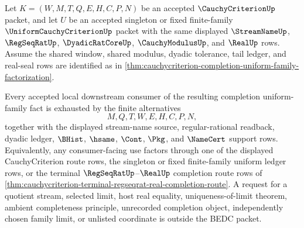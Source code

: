 \begin{lemma}
\label{lem:cauchycriterion-completion-uniform-family-downstream-coverage}
Let $K=(W,M,T,Q,E,H,C,P,N)$ be an accepted $\CauchyCriterionUp$ packet, and let $U$ be an accepted singleton or fixed finite-family $\UniformCauchyCriterionUp$ packet with the same displayed $\StreamNameUp$, $\RegSeqRatUp$, $\DyadicRatCoreUp$, $\CauchyModulusUp$, and $\RealUp$ rows. Assume the shared window, shared modulus, dyadic tolerance, tail ledger, and real-seal rows are identified as in \autoref{thm:cauchycriterion-completion-uniform-family-factorization}.

Every accepted local downstream consumer of the resulting completion uniform-family fact is exhausted by the finite alternatives
$$
M,Q,T,W,E,H,C,P,N,
$$
together with the displayed stream-name source, regular-rational readback, dyadic ledger, $\BHist$, $\hsame$, $\Cont$, $\Pkg$, and $\NameCert$ support rows. Equivalently, any consumer-facing use factors through one of the displayed CauchyCriterion route rows, the singleton or fixed finite-family uniform ledger rows, or the terminal $\RegSeqRatUp$--$\RealUp$ completion route rows of \autoref{thm:cauchycriterion-terminal-regseqrat-real-completion-route}. A request for a quotient stream, selected limit, host real equality, uniqueness-of-limit theorem, ambient completeness principle, unrecorded completion object, independently chosen family limit, or unlisted coordinate is outside the BEDC packet.
\end{lemma}
